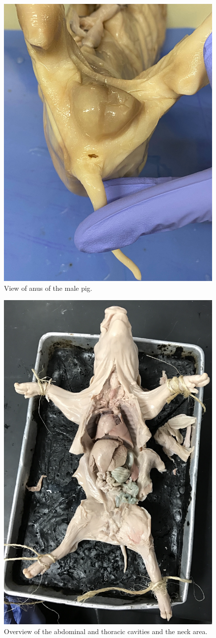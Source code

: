 \begin{figure}

{\centering \includegraphics[width=0.7\linewidth]{./figures/pig/pig_male} 

}

\caption{View of anus of the male pig.}\label{fig:anus}
\end{figure}

\begin{figure}

{\centering \includegraphics[width=0.7\linewidth]{./figures/pig/pig} 

}

\caption{Overview of the abdominal and thoracic cavities and the neck area.}\label{fig:pig}
\end{figure}

